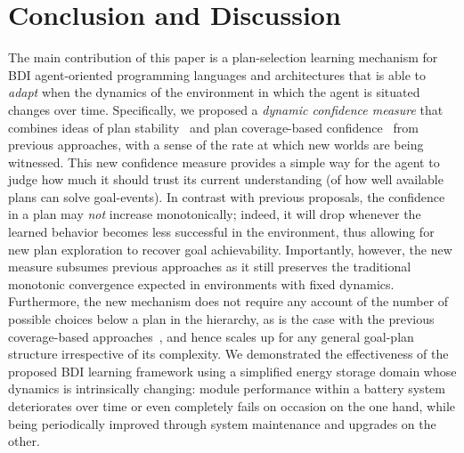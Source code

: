 \section{Conclusion and Discussion}\label{sec:discussion}

The main contribution of this paper is a plan-selection learning mechanism for BDI agent-oriented programming languages and architectures that is able to \emph{adapt} when the dynamics of the environment in which the agent is situated changes over time.
Specifically, we proposed a \emph{dynamic confidence measure} that combines ideas of plan stability~\cite{airiau09:enhancing} and plan coverage-based confidence~\cite{singh10:extending,singh10:learning} from previous approaches, with a sense of the rate at which new worlds are being witnessed. This new confidence measure provides a simple way for the agent to judge how much it should trust its current understanding (of how well available plans can solve goal-events). 
In contrast with previous proposals, the confidence in a plan may \emph{not} increase monotonically; indeed, it will drop whenever the learned behavior becomes less successful in the environment, thus allowing for new plan exploration to recover goal achievability. 
%
Importantly, however, the new measure subsumes previous approaches as it still preserves the traditional monotonic convergence expected in environments with fixed dynamics.
%
Furthermore, the new mechanism does not require any account of the number of possible choices below a plan in the hierarchy, as is the case with the previous coverage-based approaches~\cite{singh10:extending,singh10:learning}, and hence scales up for any general goal-plan structure irrespective of its complexity. 
We demonstrated the effectiveness of the proposed BDI learning framework using a simplified energy storage domain whose dynamics is intrinsically changing: module performance within a battery system deteriorates over time or even completely fails on occasion on the one hand, while being periodically improved through system maintenance and upgrades on the other.  

